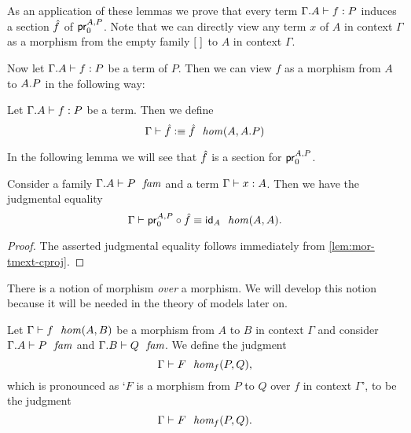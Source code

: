 As an application of these lemmas we prove that every term $\jterm{{\Gamma}{A}}{P}{f}$
induces a section $\hat{f}$ of $\cprojfstf{A}{P}$.
Note that we can directly view any term $x$ of $A$ in context $\Gamma$ as a
morphism from the empty family ${[\;]}_{}$ to $A$ in context $\Gamma$. 

Now let $\jterm{{\Gamma}{A}}{P}{f}$ be a term of $P$. Then we can view $f$ as a
morphism from $A$ to $\ctxext{A}{P}$ in the following way:

\begin{defn}\label{defn:terms-as-sections}
Let $\jterm{{\Gamma}{A}}{P}{f}$ be a term. Then we define
\begin{equation*}
\jhomdefn{\Gamma}{A}{{A}{P}}{\jtermashom{f}}{\unfold{\jtermashom{f}}}
\end{equation*}
\end{defn}

In the following lemma we will see that $\hat{f}$ is a section for
$\cprojfstf{A}{P}$.

\begin{cor}
Consider a family $\jfam{{\Gamma}{A}}{P}$ and a term $\jterm{\Gamma}{A}{x}$.
Then we have the judgmental equality
\begin{equation*}
\jhomeq{\Gamma}{A}{A}{\jcomp{A}{\jtermashom{f}}{\cprojfstf{A}{P}}}{\idtm{A}}.
\end{equation*}
\end{cor}

\begin{proof}
The asserted judgmental equality follows immediately from \autoref{lem:mor-tmext-cproj}.
\end{proof}

There is a notion of morphism \emph{over} a morphism. We will develop this
notion because it will be needed in the theory of models later on.

\begin{defn}
Let $\jhom{\Gamma}{A}{B}{f}$ be a morphism from $A$ to $B$ in context $\Gamma$
and consider $\jfam{{\Gamma}{A}}{P}$ and $\jfam{{\Gamma}{B}}{Q}$. We define the
judgment\begin{equation*}
\jfhom{\Gamma}{A}{B}{f}{P}{Q}{F},
\end{equation*}
which is pronounced as `$F$ is a morphism from $P$ to $Q$ over $f$ in context
$\Gamma$', to be the judgment\begin{equation*}
\unfold{\jfhom{\Gamma}{A}{B}{f}{P}{Q}{F}}.
\end{equation*}
\end{defn}

